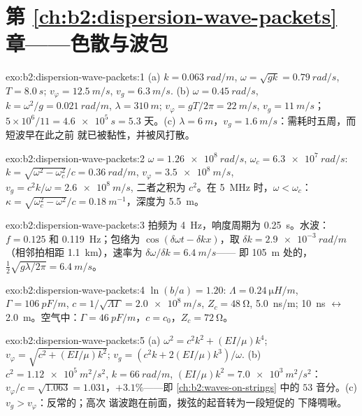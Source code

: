 \section*{第 \ref{ch:b2:dispersion-wave-packets} 章——色散与波包}

\begin{solution}{exo:b2:dispersion-wave-packets:1}
(a) $k = \qty{0.063}{rad/m}$, $\omega = \sqrt{gk} = \qty{0.79}{rad/s}$, $T = \qty{8.0}{s}$;
$v_\varphi = \qty{12.5}{m/s}$, $v_g = \qty{6.3}{m/s}$. (b) $\omega = \qty{0.45}{rad/s}$, $k = \omega^2
/g = \qty{0.021}{rad/m}$, $\lambda = \qty{310}{m}$; $v_\varphi = gT/2\pi = \qty{22}{m/s}$, $v_g =
\qty{11}{m/s}$；$5 \times 10^6/11 = \qty{4.6e5}{s} = 5.3$ 天。(c) $\lambda = \qty{6}{m}$，$v_g
= \qty{1.6}{m/s}$：需耗时五周，而短波早在此之前
就已被黏性，并被风打散。
\end{solution}

\begin{solution}{exo:b2:dispersion-wave-packets:2}
$\omega = \qty{1.26e8}{rad/s}$, $\omega_c = \qty{6.3e7}{rad/s}$: $k = \sqrt{\omega^2 - \omega_c^2}/c =
\qty{0.36}{rad/m}$, $v_\varphi = \qty{3.5e8}{m/s}$, $v_g = c^2k/\omega = \qty{2.6e8}{m/s}$,
二者之积为 $c^2$。在 \qty{5}{MHz} 时，$\omega < \omega_c$：$\kappa = \sqrt{\omega_c^2 - \omega^2}/c =
\qty{0.18}{m^{-1}}$，深度为 \qty{5.5}{m}。
\end{solution}

\begin{solution}{exo:b2:dispersion-wave-packets:3}
拍频为 \qty{4}{Hz}，响度周期为 \qty{0.25}{s}。水波：$f = 0.125$ 和
\qty{0.119}{Hz}；包络为 $\cos(\delta\omega t - \delta kx)$，取 $\delta k = \qty{2.9e-3}{rad/m}$
（相邻拍相距 \qty{1.1}{km}），速率为 $\delta\omega/\delta k = \qty{6.4}{m/s}$——
即 \qty{105}{m} 处的，$\tfrac12\sqrt{g\lambda/2\pi} = \qty{6.4}{m/s}$。
\end{solution}

\begin{solution}{exo:b2:dispersion-wave-packets:4}
$\ln(b/a) = 1.20$: $\Lambda = \qty{0.24}{\micro H/m}$, $\Gamma = \qty{106}{pF/m}$, $c = 1/
\sqrt{\Lambda\Gamma} = \qty{2.0e8}{m/s}$, $Z_c = \qty{48}{\ohm}$, \qty{5.0}{ns/m}; \qty{10}{ns}
$\leftrightarrow$ \qty{2.0}{m}。空气中：$\Gamma = \qty{46}{pF/m}$，$c = c_0$，$Z_c = \qty{72}{\ohm}$。
\end{solution}

\begin{solution}{exo:b2:dispersion-wave-packets:5}
(a) $\omega^2 = c^2k^2 + (EI/\mu)k^4$; $v_\varphi = \sqrt{c^2 + (EI/\mu)k^2}$; $v_g = (c^2k +
2(EI/\mu)k^3)/\omega$. (b) $c^2 = \qty{1.12e5}{m^2/s^2}$, $k = \qty{66}{rad/m}$, $(EI/\mu)k^2
= \qty{7.0e3}{m^2/s^2}$：$v_\varphi/c = \sqrt{1.063} = 1.031$，$+3.1\%$——即
\cref{ch:b2:waves-on-strings} 中的 $53$ 音分。(c) $v_g > v_\varphi$：反常的；高次
谐波跑在前面，拨弦的起音转为一段短促的
下降啁啾。
\end{solution}

